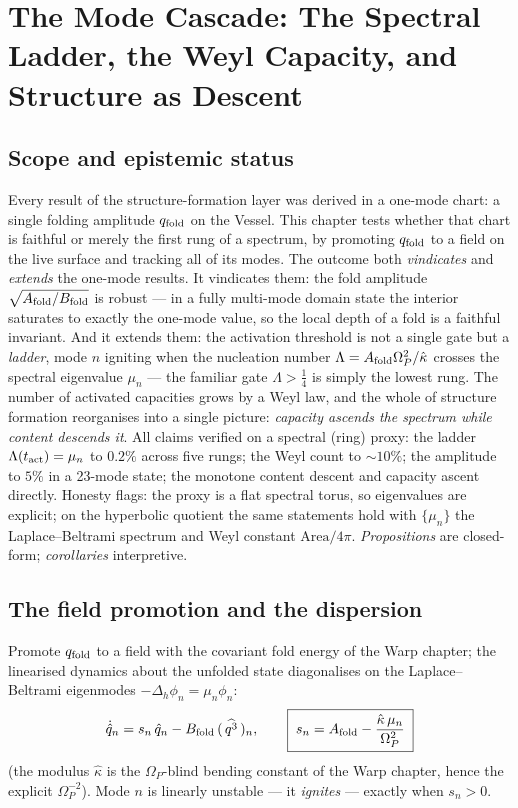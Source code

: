 \documentclass[11pt,a4paper,oneside]{book}
\newcommand{\Op}{\Omega_P}
\newcommand{\qf}{q_{\rm fold}}
\newcommand{\Afold}{A_{\rm fold}}
\newcommand{\Bfold}{B_{\rm fold}}
\newcommand{\kw}{\hat\kappa}
\theoremstyle{plain}
\theoremstyle{definition}
\theoremstyle{remark}
\begin{document}
\chapter{The Mode Cascade: The Spectral Ladder, the Weyl Capacity, and Structure as Descent}

\section*{Scope and epistemic status}
Every result of the structure-formation layer was derived in a one-mode chart: a single folding
amplitude $\qf$ on the Vessel. This chapter tests whether that chart is faithful or merely the first
rung of a spectrum, by promoting $\qf$ to a field on the live surface and tracking all of its modes.
The outcome both \emph{vindicates} and \emph{extends} the one-mode results. It vindicates them: the
fold amplitude $\sqrt{\Afold/\Bfold}$ is robust --- in a fully multi-mode domain state the interior
saturates to exactly the one-mode value, so the local depth of a fold is a faithful invariant. And it
extends them: the activation threshold is not a single gate but a \emph{ladder}, mode $n$ igniting
when the nucleation number $\Lambda=\Afold\Op^2/\kw$ crosses the spectral eigenvalue $\mu_n$ --- the
familiar gate $\Lambda>\tfrac14$ is simply the lowest rung. The number of activated capacities grows
by a Weyl law, and the whole of structure formation reorganises into a single picture: \emph{capacity
ascends the spectrum while content descends it}. All claims verified on a spectral (ring) proxy: the
ladder $\Lambda(t_{\rm act})=\mu_n$ to $0.2\%$ across five rungs; the Weyl count to $\sim10\%$; the
amplitude to $5\%$ in a 23-mode state; the monotone content descent and capacity ascent directly.
Honesty flags: the proxy is a flat spectral torus, so eigenvalues are explicit; on the hyperbolic
quotient the same statements hold with $\{\mu_n\}$ the Laplace--Beltrami spectrum and Weyl constant
$\mathrm{Area}/4\pi$. \emph{Propositions} are closed-form; \emph{corollaries} interpretive.

\section{The field promotion and the dispersion}

Promote $\qf$ to a field with the covariant fold energy of the Warp chapter; the linearised dynamics
about the unfolded state diagonalises on the Laplace--Beltrami eigenmodes
$-\Delta_h\phi_n=\mu_n\phi_n$:
\begin{equation}
\dot{\hat q}_n=s_n\,\hat q_n-\Bfold\,(\,\widehat{q^3}\,)_n,
\qquad
\boxed{\;s_n=\Afold-\frac{\kw\,\mu_n}{\Op^{2}}\;}
\end{equation}
(the modulus $\kw$ is the $\Op$-blind bending constant of the Warp chapter, hence the explicit
$\Op^{-2}$). Mode $n$ is linearly unstable --- it \emph{ignites} --- exactly when $s_n>0$.
\end{document}
